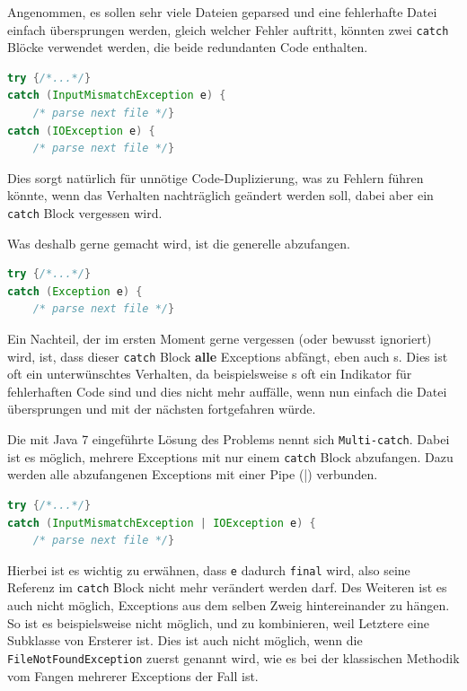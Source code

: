 \documentclass[times, 10pt,twocolumn]{article}
\begin{document}
Angenommen, es sollen sehr viele Dateien geparsed und eine fehlerhafte Datei einfach übersprungen werden, 
gleich welcher Fehler auftritt, könnten zwei \texttt{catch} Blöcke verwendet werden, die beide redundanten Code enthalten.
\begin{lstlisting}[language=java,breaklines=true]
try {/*...*/} 
catch (InputMismatchException e) {
	/* parse next file */}
catch (IOException e) {
	/* parse next file */}
\end{lstlisting} 
Dies sorgt natürlich für unnötige Code-Duplizierung, was zu Fehlern führen könnte, wenn das Verhalten nachträglich geändert 
werden soll, dabei aber ein \texttt{catch} Block vergessen wird.

Was deshalb gerne gemacht wird, ist die generelle  abzufangen.
\begin{lstlisting}[language=java,breaklines=true]
try {/*...*/} 
catch (Exception e) {
	/* parse next file */}
\end{lstlisting}
Ein Nachteil, der im ersten Moment gerne vergessen (oder bewusst ignoriert) wird, ist, dass dieser \texttt{catch} Block 
\textbf{alle} Exceptions abfängt, eben auch s. Dies ist oft ein unterwünschtes Verhalten, da 
beispielsweise s oft ein Indikator für fehlerhaften Code sind und dies nicht mehr auffälle,
wenn nun einfach die Datei übersprungen und mit der nächsten fortgefahren würde.

Die mit Java 7 eingeführte Lösung des Problems nennt sich \texttt{Multi-catch}. Dabei ist es möglich, mehrere Exceptions
mit nur einem \texttt{catch} Block abzufangen. Dazu werden alle abzufangenen Exceptions mit einer Pipe (|) verbunden.\cite{javainsel2}
\begin{lstlisting}[language=java,breaklines=true]
try {/*...*/} 
catch (InputMismatchException | IOException e) {
	/* parse next file */}
\end{lstlisting}
Hierbei ist es wichtig zu erwähnen, dass \texttt{e} dadurch \texttt{final} wird, also seine Referenz im \texttt{catch} Block 
nicht mehr verändert werden darf. Des Weiteren ist es auch nicht möglich, Exceptions aus dem selben Zweig hintereinander
zu hängen. So ist es beispielsweise nicht möglich,  und  zu kombinieren,
weil Letztere eine Subklasse von Ersterer ist. Dies ist auch nicht möglich, wenn die \texttt{FileNotFoundException} zuerst
genannt wird, wie es bei der klassischen Methodik vom Fangen mehrerer Exceptions der Fall ist.
\end{document}
